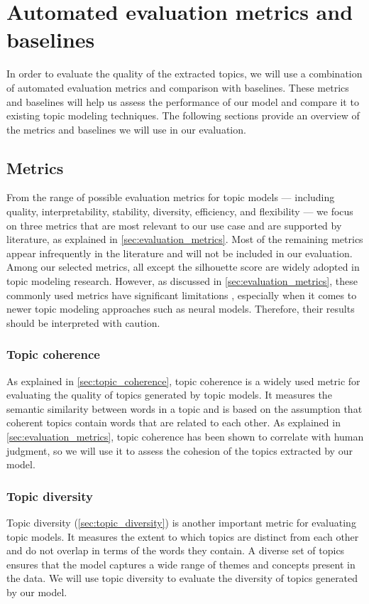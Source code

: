\section{Automated evaluation metrics and baselines}
\label{sec:automated_evaluation}
In order to evaluate the quality of the extracted topics, we will use a combination of automated evaluation metrics and comparison with baselines. These metrics and baselines will help us assess the performance of our model and compare it to existing topic modeling techniques. The following sections provide an overview of the metrics and baselines we will use in our evaluation.

\subsection{Metrics}
From the range of possible evaluation metrics for topic models — including quality, interpretability, stability, diversity, efficiency, and flexibility — we focus on three metrics that are most relevant to our use case and are supported by literature, as explained in \cref{sec:evaluation_metrics}. Most of the remaining metrics appear infrequently in the literature and will not be included in our evaluation. Among our selected metrics, all except the silhouette score are widely adopted in topic modeling research. However, as discussed in \cref{sec:evaluation_metrics}, these commonly used metrics have significant limitations \cite{doogan_topic_2021, hoyle_is_2021}, especially when it comes to newer topic modeling approaches such as neural models. Therefore, their results should be interpreted with caution.

\subsubsection{Topic coherence}
As explained in \cref{sec:topic_coherence}, topic coherence is a widely used metric for evaluating the quality of topics generated by topic models. It measures the semantic similarity between words in a topic and is based on the assumption that coherent topics contain words that are related to each other. As explained in \cref{sec:evaluation_metrics}, topic coherence has been shown to correlate with human judgment, so we will use it to assess the cohesion of the topics extracted by our model.

\subsubsection{Topic diversity}
Topic diversity (\cref{sec:topic_diversity}) is another important metric for evaluating topic models. It measures the extent to which topics are distinct from each other and do not overlap in terms of the words they contain. A diverse set of topics ensures that the model captures a wide range of themes and concepts present in the data. We will use topic diversity to evaluate the diversity of topics generated by our model.

